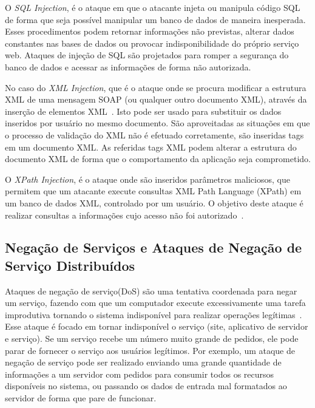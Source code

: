 O \emph{SQL Injection}, é o ataque em que o atacante injeta ou manipula código SQL de forma que seja possível manipular um banco de dados de maneira inesperada\cite{harwood2010security}. Esses procedimentos podem retornar informações não previstas, alterar dados constantes nas bases de dados ou provocar indisponibilidade do próprio serviço web.  Ataques de injeção de SQL são projetados para romper a segurança do banco de dados e acessar as informações de forma não autorizada.

No caso do \emph{XML Injection}, que é o ataque onde se procura modificar a estrutura XML de uma mensagem SOAP (ou qualquer outro documento XML), através da inserção de elementos XML~\cite{JensenGHL2007}. Isto pode ser usado para substituir os dados inseridos por usuário no mesmo documento. São aproveitadas as situações em que o processo de validação do XML não é efetuado corretamente, são inseridas tags em um documento XML. As referidas tags XML podem alterar a estrutura do documento XML de forma que o comportamento da aplicação seja comprometido.

O \emph{XPath Injection}, é o ataque onde são inseridos parâmetros maliciosos, que permitem que um atacante execute consultas XML Path Language (XPath) em um banco de dados XML, controlado por um usuário. O objetivo deste ataque é realizar consultas a informações cujo acesso não foi autorizado~\cite{harwood2010security}.

\subsection{Negação de Serviços e Ataques de Negação de Serviço Distribuídos}

Ataques de negação de serviço(DoS) são uma tentativa coordenada para negar um serviço, fazendo com que um computador execute excessivamente uma tarefa improdutiva tornando o sistema indisponível para realizar operações legítimas~\cite{kim2010fundamentals}. Esse ataque é focado em tornar indisponível o serviço (site, aplicativo de servidor e serviço). Se um serviço recebe um número muito grande de pedidos, ele pode parar de fornecer o serviço aos usuários legítimos. Por exemplo, um ataque de negação de serviço pode ser realizado enviando uma grande quantidade de informações a um servidor com pedidos para consumir todos os recursos disponíveis no sistema, ou passando os dados de entrada mal formatados ao servidor de forma que pare de funcionar.

